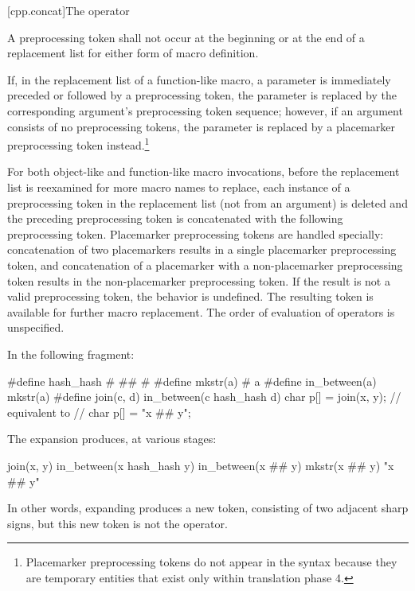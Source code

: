 [cpp.concat]{The \tcode{\#\#} operator}%
%

\pnum
A
\tcode{\#\#}
preprocessing token shall not occur at the beginning or
at the end of a replacement list for either form
of macro definition.

\pnum
If, in the replacement list of a function-like macro, a parameter is
immediately preceded or followed by a
\tcode{\#\#}
preprocessing token, the parameter is replaced by the
corresponding argument's preprocessing token sequence; however, if an argument consists of no preprocessing tokens, the parameter is
replaced by a placemarker preprocessing token instead.\footnote{Placemarker preprocessing tokens do not appear in the syntax
because they are temporary entities that exist only within translation phase 4.}

\pnum
For both object-like and function-like macro invocations, before the
replacement list is reexamined for more macro names to replace,
each instance of a
\tcode{\#\#}
preprocessing token in the replacement list
(not from an argument) is deleted and the
preceding preprocessing token is concatenated
with the following preprocessing token.
Placemarker preprocessing tokens are handled specially: concatenation
of two placemarkers results in a single placemarker preprocessing token, and
concatenation of a placemarker with a non-placemarker preprocessing token results
in the non-placemarker preprocessing token.
If the result is not a valid preprocessing token,
the behavior is undefined.
The resulting token is available for further macro replacement.
The order of evaluation of
\tcode{\#\#}
operators is unspecified.

\enterexample In the following fragment:

\begin{codeblock}
#define hash_hash # ## #
#define mkstr(a) # a
#define in_between(a) mkstr(a)
#define join(c, d) in_between(c hash_hash d)
char p[] = join(x, y);          // equivalent to
                                // char p[] = "x \#\# y";
\end{codeblock}

The expansion produces, at various stages:

\begin{codeblock}
join(x, y)
in_between(x hash_hash y)
in_between(x ## y)
mkstr(x ## y)
"x ## y"
\end{codeblock}

In other words, expanding  produces a new token,
consisting of two adjacent sharp signs, but this new token is not the
\tcode{\#\#} operator. \exitexample

